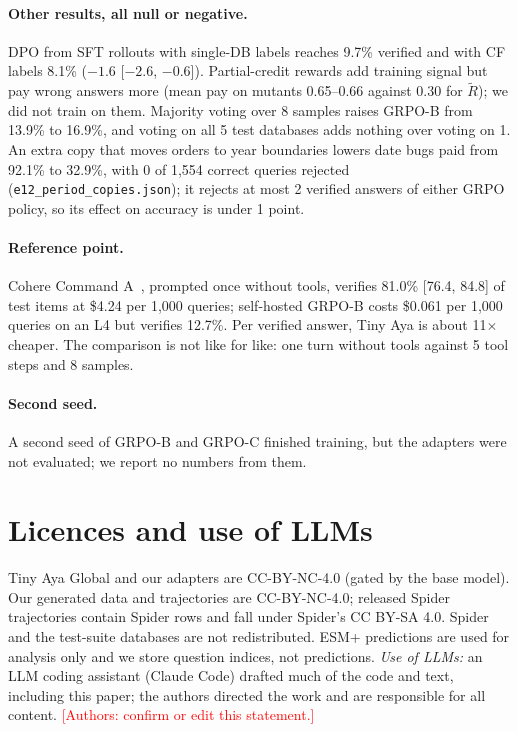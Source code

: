 \documentclass{article}
\newcommand{\placeholder}[1]{\textcolor{red}{[#1]}}
\begin{document}
\paragraph{Other results, all null or negative.}
DPO from SFT rollouts with single-DB labels reaches 9.7\% verified and with CF labels 8.1\% ($-1.6$ [$-2.6$, $-0.6$]). Partial-credit rewards add training signal but pay wrong answers more (mean pay on mutants 0.65--0.66 against 0.30 for $\tilde R$); we did not train on them. Majority voting over 8 samples raises GRPO-B from 13.9\% to 16.9\%, and voting on all 5 test databases adds nothing over voting on 1. An extra copy that moves orders to year boundaries lowers date bugs paid from 92.1\% to 32.9\%, with 0 of 1,554 correct queries rejected (\texttt{e12\_period\_copies.json}); it rejects at most 2 verified answers of either GRPO policy, so its effect on accuracy is under 1 point.

\paragraph{Reference point.}
Cohere Command A~\citep{cohere2025commanda}, prompted once without tools, verifies 81.0\% [76.4, 84.8] of test items at \$4.24 per 1,000 queries; self-hosted GRPO-B costs \$0.061 per 1,000 queries on an L4 but verifies 12.7\%. Per verified answer, Tiny Aya is about 11$\times$ cheaper. The comparison is not like for like: one turn without tools against 5 tool steps and 8 samples.

\paragraph{Second seed.}
A second seed of GRPO-B and GRPO-C finished training, but the adapters were not evaluated; we report no numbers from them.

\section{Licences and use of LLMs}
\label{app:licences}

Tiny Aya Global and our adapters are CC-BY-NC-4.0 (gated by the base model). Our generated data and trajectories are CC-BY-NC-4.0; released Spider trajectories contain Spider rows and fall under Spider's CC BY-SA 4.0. Spider and the test-suite databases are not redistributed. ESM+ predictions are used for analysis only and we store question indices, not predictions. \emph{Use of LLMs:} an LLM coding assistant (Claude Code) drafted much of the code and text, including this paper; the authors directed the work and are responsible for all content. \placeholder{Authors: confirm or edit this statement.}
\end{document}
